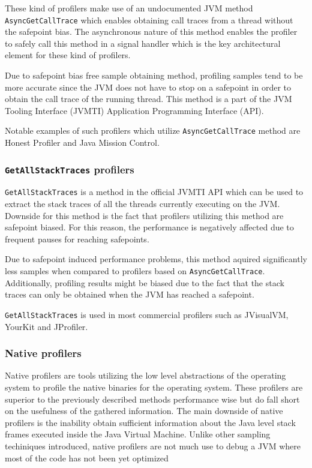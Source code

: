 \documentclass[..thesis.tex]{subfiles}
\begin{document}
These kind of profilers make use of an undocumented JVM method \texttt{Async\-Get\-Call\-Trace} \cite{agct_source} which enables obtaining call traces from a thread without the safepoint bias. The asynchronous nature of this method enables the profiler to safely call this method in a signal handler which is the key architectural element for these kind of profilers.

Due to safepoint bias free sample obtaining method, profiling samples tend to be more accurate since the JVM does not have to stop on a safepoint in order to obtain the call trace of the running thread. This method is a part of the JVM Tooling Interface (JVMTI) Application Programming Interface (API).

Notable examples of such profilers which utilize \texttt{Async\-Get\-Call\-Trace} method  are Honest Profiler and Java Mission Control. 


\subsubsection{\texttt{GetAllStackTraces} profilers}
\texttt{GetAllStackTraces} is a method in the official JVMTI API which can be used to extract the stack traces of all the threads currently executing on the JVM\cite{jvmti_doc}. Downside for this method is the fact that profilers utilizing this method are safepoint biased. For this reason, the performance is negatively affected due to frequent pauses for reaching safepoints.

Due to safepoint induced performance problems, this method aquired significantly less samples when compared to profilers based on \texttt{Async\-Get\-Call\-Trace}. Additionally, profiling results might be biased due to the fact that the stack traces can only be obtained when the JVM has reached a safepoint.

\texttt{GetAllStackTraces} is used in most commercial profilers such as JVisualVM, YourKit and JProfiler. \cite{visualvm} \cite{wakart_psychosomatic_2016}

\subsubsection{Native profilers}
Native profilers are tools utilizing the low level abstractions of the operating system to  profile the native binaries for the operating system. These profilers are superior to the previously described methods performance wise but do fall short on the usefulness of the gathered information. The main downside of native profilers is the inability obtain sufficient information about the Java level stack frames executed inside the Java Virtual Machine. Unlike other sampling techiniques introduced, native profilers are not much use to debug a JVM where most of the code has not been yet optimized
\end{document}
